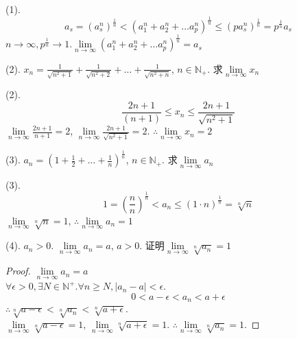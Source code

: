 \begin{solve*}(1).
	\begin{equation*}\label{ex2.2.4Ex2}
		a_s = (a_s^n)^\frac{1}{n}
		<
		(a_1^n+a_2^n+\dots a_p^n)^\frac{1}{n}
		\leqslant
		(p a_s^n)^\frac{1}{n}=p^\frac{1}{n}a_s
	\end{equation*}
$ n\rightarrow\infty, p^\frac{1}{n}\rightarrow 1 $.$ \lim\limits_{n\rightarrow\infty}(a_1^n+a_2^n+\dots a_p^n)^\frac{1}{n} = a_s $
\end{solve*}

(2). $ x_n= \frac{1}{\sqrt{n^2+1}}+\frac{1}{\sqrt{n^2+2}}+\dots+\frac{1}{\sqrt{n^2+n}} $, $ n\in \mathbb{N}_+ $. 求$ \lim\limits_{n\rightarrow\infty} x_n $
\begin{solve*}(2).
\begin{equation*}
	\frac{2n+1}{(n+1)}\leqslant x_n\leqslant \frac{2n+1}{\sqrt{n^2+1}}
\end{equation*}
$ \lim\limits_{n\rightarrow\infty}\frac{2n+1}{n+1}=2 $, 
$ \lim\limits_{n\rightarrow\infty}\frac{2n+1}{\sqrt{n^2+1}}=2 $.
$ \therefore \lim\limits_{n\rightarrow\infty} x_n = 2 $
\end{solve*}

(3). $ a_n = (1+\frac{1}{2}+\dots+\frac{1}{n})^{\frac{1}{n}} $, $ n\in\mathbb{N}_+ $. 求$ \lim\limits_{n\rightarrow\infty}a_n $
\begin{solve*}(3).
	\begin{equation*}
		1=(\frac{n}{n})^\frac{1}{n} < a_n \leqslant (1\cdot n)^\frac{1}{n}=\sqrt[n]{n}
	\end{equation*}
$ \lim\limits_{n\rightarrow\infty} \sqrt[n]{n}=1 $, $ \therefore \lim\limits_{n\rightarrow\infty} a_n = 1$
\end{solve*}

(4). $ a_n>0 $. $ \lim\limits_{n\rightarrow\infty}a_n = a $, $ a>0 $. 证明$ \lim\limits_{n\rightarrow\infty} \sqrt[n]{a_n}=1 $
\begin{proof}
$ \lim\limits_{n\rightarrow\infty}a_n = a $\\
$\forall \epsilon >0, \exists N \in \mathbb{N}^+. \forall n \geqslant N, |a_n-a| < \epsilon$.
\begin{equation*}
	0<a-\epsilon<a_n<a+\epsilon
\end{equation*}
$ \therefore \sqrt[n]{a-\epsilon}<\sqrt[n]{a_n}<\sqrt[n]{a+\epsilon} $.\\
$ \lim\limits_{n\rightarrow\infty}\sqrt[n]{a-\epsilon} = 1 $,
$ \lim\limits_{n\rightarrow\infty}\sqrt[n]{a+\epsilon} = 1 $. $ \therefore  \lim\limits_{n\rightarrow\infty}\sqrt[n]{a_n} = 1  $.
\end{proof}


